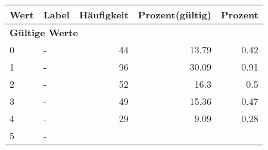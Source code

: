      \begin{longtable}{lXrrr}
     \toprule
     \textbf{Wert} & \textbf{Label} & \textbf{Häufigkeit} & \textbf{Prozent(gültig)} & \textbf{Prozent} \\
     \endhead
     \midrule
     \multicolumn{5}{l}{\textbf{Gültige Werte}}\\

     0 &
     \multicolumn{1}{X}{ -  } &


       \num{44} &
       \num[round-mode=places,round-precision=2]{13.79} &
         \num[round-mode=places,round-precision=2]{0.42} \\

     1 &
     \multicolumn{1}{X}{ -  } &


       \num{96} &
       \num[round-mode=places,round-precision=2]{30.09} &
         \num[round-mode=places,round-precision=2]{0.91} \\

     2 &
     \multicolumn{1}{X}{ -  } &


       \num{52} &
       \num[round-mode=places,round-precision=2]{16.3} &
         \num[round-mode=places,round-precision=2]{0.5} \\

     3 &
     \multicolumn{1}{X}{ -  } &


       \num{49} &
       \num[round-mode=places,round-precision=2]{15.36} &
         \num[round-mode=places,round-precision=2]{0.47} \\

     4 &
     \multicolumn{1}{X}{ -  } &


       \num{29} &
       \num[round-mode=places,round-precision=2]{9.09} &
         \num[round-mode=places,round-precision=2]{0.28} \\

     5 &
     \multicolumn{1}{X}{ -  } &



\end{longtable}
